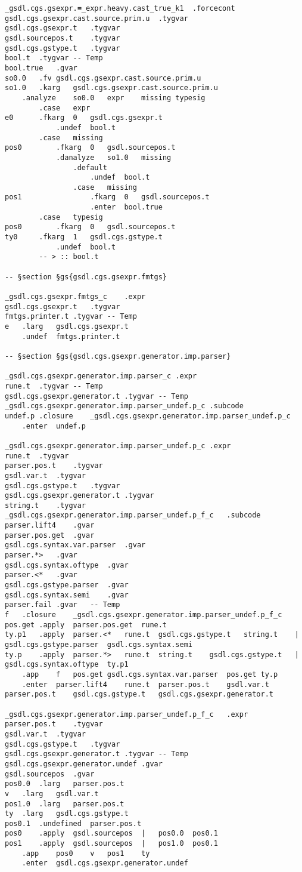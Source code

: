 \documentclass{report}
\begin{document}
\begin{verbatim}
_gsdl.cgs.gsexpr.≡_expr.heavy.cast_true_k1	.forcecont
gsdl.cgs.gsexpr.cast.source.prim.u	.tygvar
gsdl.cgs.gsexpr.t	.tygvar
gsdl.sourcepos.t	.tygvar
gsdl.cgs.gstype.t	.tygvar
bool.t	.tygvar	-- Temp
bool.true	.gvar
so0.0	.fv	gsdl.cgs.gsexpr.cast.source.prim.u
so1.0	.karg	gsdl.cgs.gsexpr.cast.source.prim.u
	.analyze	so0.0	expr	missing	typesig
		.case	expr
e0		.fkarg	0	gsdl.cgs.gsexpr.t
			.undef	bool.t
		.case	missing
pos0		.fkarg	0	gsdl.sourcepos.t
			.danalyze	so1.0	missing
				.default
					.undef	bool.t
				.case	missing
pos1				.fkarg	0	gsdl.sourcepos.t
					.enter	bool.true
		.case	typesig
pos0		.fkarg	0	gsdl.sourcepos.t
ty0		.fkarg	1	gsdl.cgs.gstype.t
			.undef	bool.t
		-- > :: bool.t

-- §section §gs{gsdl.cgs.gsexpr.fmtgs}

_gsdl.cgs.gsexpr.fmtgs_c	.expr
gsdl.cgs.gsexpr.t	.tygvar
fmtgs.printer.t	.tygvar	-- Temp
e	.larg	gsdl.cgs.gsexpr.t
	.undef	fmtgs.printer.t

-- §section §gs{gsdl.cgs.gsexpr.generator.imp.parser}

_gsdl.cgs.gsexpr.generator.imp.parser_c	.expr
rune.t	.tygvar	-- Temp
gsdl.cgs.gsexpr.generator.t	.tygvar	-- Temp
_gsdl.cgs.gsexpr.generator.imp.parser_undef.p_c	.subcode
undef.p	.closure	_gsdl.cgs.gsexpr.generator.imp.parser_undef.p_c
	.enter	undef.p

_gsdl.cgs.gsexpr.generator.imp.parser_undef.p_c	.expr
rune.t	.tygvar
parser.pos.t	.tygvar
gsdl.var.t	.tygvar
gsdl.cgs.gstype.t	.tygvar
gsdl.cgs.gsexpr.generator.t	.tygvar
string.t	.tygvar
_gsdl.cgs.gsexpr.generator.imp.parser_undef.p_f_c	.subcode
parser.lift4	.gvar
parser.pos.get	.gvar
gsdl.cgs.syntax.var.parser	.gvar
parser.*>	.gvar
gsdl.cgs.syntax.oftype	.gvar
parser.<*	.gvar
gsdl.cgs.gstype.parser	.gvar
gsdl.cgs.syntax.semi	.gvar
parser.fail	.gvar	-- Temp
f	.closure	_gsdl.cgs.gsexpr.generator.imp.parser_undef.p_f_c
pos.get	.apply	parser.pos.get	rune.t
ty.p1	.apply	parser.<*	rune.t	gsdl.cgs.gstype.t	string.t	|	gsdl.cgs.gstype.parser	gsdl.cgs.syntax.semi
ty.p	.apply	parser.*>	rune.t	string.t	gsdl.cgs.gstype.t	|	gsdl.cgs.syntax.oftype	ty.p1
	.app	f	pos.get	gsdl.cgs.syntax.var.parser	pos.get	ty.p
	.enter	parser.lift4	rune.t	parser.pos.t	gsdl.var.t	parser.pos.t	gsdl.cgs.gstype.t	gsdl.cgs.gsexpr.generator.t

_gsdl.cgs.gsexpr.generator.imp.parser_undef.p_f_c	.expr
parser.pos.t	.tygvar
gsdl.var.t	.tygvar
gsdl.cgs.gstype.t	.tygvar
gsdl.cgs.gsexpr.generator.t	.tygvar	-- Temp
gsdl.cgs.gsexpr.generator.undef	.gvar
gsdl.sourcepos	.gvar
pos0.0	.larg	parser.pos.t
v	.larg	gsdl.var.t
pos1.0	.larg	parser.pos.t
ty	.larg	gsdl.cgs.gstype.t
pos0.1	.undefined	parser.pos.t
pos0	.apply	gsdl.sourcepos	|	pos0.0	pos0.1
pos1	.apply	gsdl.sourcepos	|	pos1.0	pos0.1
	.app	pos0	v	pos1	ty
	.enter	gsdl.cgs.gsexpr.generator.undef


\end{verbatim}
\end{document}
